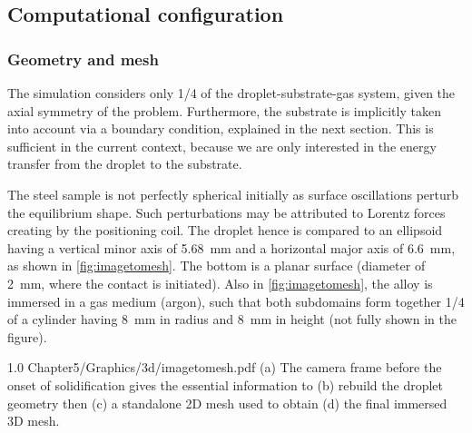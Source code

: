 \subsection{Computational configuration}
\subsubsection{Geometry and mesh}
The simulation considers only 1/4 of the droplet-substrate-gas system, given the axial symmetry of the problem.
Furthermore, the substrate is implicitly taken into account via a boundary condition, explained in the next section. 
This is sufficient in the current context, because we are only interested in the energy transfer from the droplet to the substrate. 

The steel sample is not perfectly spherical initially as surface oscillations perturb the equilibrium shape. 
Such perturbations may be attributed to Lorentz forces creating by the positioning coil. 
The droplet hence is compared to an ellipsoid having
a vertical minor axis of \SI{5.68}{\milli \metre} and a horizontal major axis of \SI{6.6}{\milli \metre}, as shown in \cref{fig:imagetomesh}.
The bottom is a planar surface (diameter of \SI{2}{\milli \metre}, where the contact is initiated). 
Also in \cref{fig:imagetomesh}, the alloy is immersed in a gas medium (argon), such that both subdomains form together 1/4 of a 
cylinder having \SI{8}{\milli \metre} in radius and  \SI{8}{\milli \metre} in height (not fully shown in the figure).

\begin{figureth}
{1.0}
{Chapter5/Graphics/3d/imagetomesh.pdf}
{(a) The camera frame before the onset of solidification gives the essential information to (b) 
rebuild the droplet geometry then (c) a standalone 2D mesh used to obtain (d) the final immersed 3D mesh.}
\label{fig:imagetomesh}
\end{figureth}

